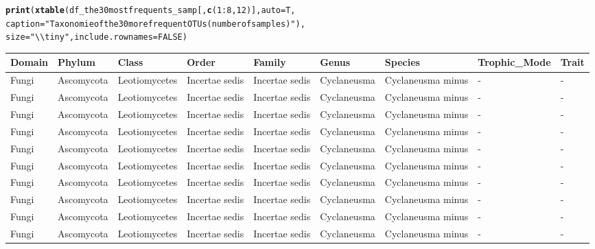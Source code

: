 \documentclass[12pt]{article}\usepackage[]{graphicx}\usepackage[]{color}
\makeatletter
\newcommand{\hlnum}[1]{\textcolor[rgb]{0.686,0.059,0.569}{#1}}%
\newcommand{\hlstr}[1]{\textcolor[rgb]{0.192,0.494,0.8}{#1}}%
\newcommand{\hlopt}[1]{\textcolor[rgb]{0,0,0}{#1}}%
\newcommand{\hlstd}[1]{\textcolor[rgb]{0.345,0.345,0.345}{#1}}%
\newcommand{\hlkwc}[1]{\textcolor[rgb]{0.333,0.667,0.333}{#1}}%
\newcommand{\hlkwd}[1]{\textcolor[rgb]{0.737,0.353,0.396}{\textbf{#1}}}%
\newenvironment{kframe}{%
 \def\at@end@of@kframe{}%
 \ifinner\ifhmode%
  \def\at@end@of@kframe{\end{minipage}}%
  \begin{minipage}{\columnwidth}%
 \fi\fi%
 \def\FrameCommand##1{\hskip\@totalleftmargin \hskip-\fboxsep
 \colorbox{shadecolor}{##1}\hskip-\fboxsep
     \hskip-\linewidth \hskip-\@totalleftmargin \hskip\columnwidth}%
 \MakeFramed {\advance\hsize-\width
   \@totalleftmargin\z@ \linewidth\hsize
   \@setminipage}}%
 {\par\unskip\endMakeFramed%
 \at@end@of@kframe}
\numberwithin{figure}{section}
\makeatother
\begin{document}
\begin{landscape}
\begin{kframe}
\begin{alltt}
\hlkwd{print}\hlstd{(}\hlkwd{xtable}\hlstd{(df_the30mostfrequents_samp[,} \hlkwd{c}\hlstd{(}\hlnum{1}\hlopt{:}\hlnum{8}\hlstd{,} \hlnum{12}\hlstd{)],} \hlkwc{auto} \hlstd{= T,}
      \hlkwc{caption} \hlstd{=} \hlstr{"Taxonomie of the 30 more frequent OTUs (number of samples)"}\hlstd{),}
      \hlkwc{size} \hlstd{=} \hlstr{"\textbackslash{}\textbackslash{}tiny"}\hlstd{,} \hlkwc{include.rownames} \hlstd{=} \hlnum{FALSE}\hlstd{)}
\end{alltt}
\end{kframe}%
\begin{table}[ht]
\centering
\begingroup\tiny
\begin{tabular}{lllllllll}
  \hline
Domain & Phylum & Class & Order & Family & Genus & Species & Trophic\_Mode & Trait \\ 
  \hline
Fungi & Ascomycota & Leotiomycetes & Incertae sedis & Incertae sedis & Cyclaneusma & Cyclaneusma minus & - & - \\ 
  Fungi & Ascomycota & Leotiomycetes & Incertae sedis & Incertae sedis & Cyclaneusma & Cyclaneusma minus & - & - \\ 
  Fungi & Ascomycota & Leotiomycetes & Incertae sedis & Incertae sedis & Cyclaneusma & Cyclaneusma minus & - & - \\ 
  Fungi & Ascomycota & Leotiomycetes & Incertae sedis & Incertae sedis & Cyclaneusma & Cyclaneusma minus & - & - \\ 
  Fungi & Ascomycota & Leotiomycetes & Incertae sedis & Incertae sedis & Cyclaneusma & Cyclaneusma minus & - & - \\ 
  Fungi & Ascomycota & Leotiomycetes & Incertae sedis & Incertae sedis & Cyclaneusma & Cyclaneusma minus & - & - \\ 
  Fungi & Ascomycota & Leotiomycetes & Incertae sedis & Incertae sedis & Cyclaneusma & Cyclaneusma minus & - & - \\ 
  Fungi & Ascomycota & Leotiomycetes & Incertae sedis & Incertae sedis & Cyclaneusma & Cyclaneusma minus & - & - \\ 
  Fungi & Ascomycota & Leotiomycetes & Incertae sedis & Incertae sedis & Cyclaneusma & Cyclaneusma minus & - & - \\ 
  Fungi & Ascomycota & Leotiomycetes & Incertae sedis & Incertae sedis & Cyclaneusma & Cyclaneusma minus & - & - \\ 

\end{tabular}
\end{table}
\end{landscape}
\end{document}
